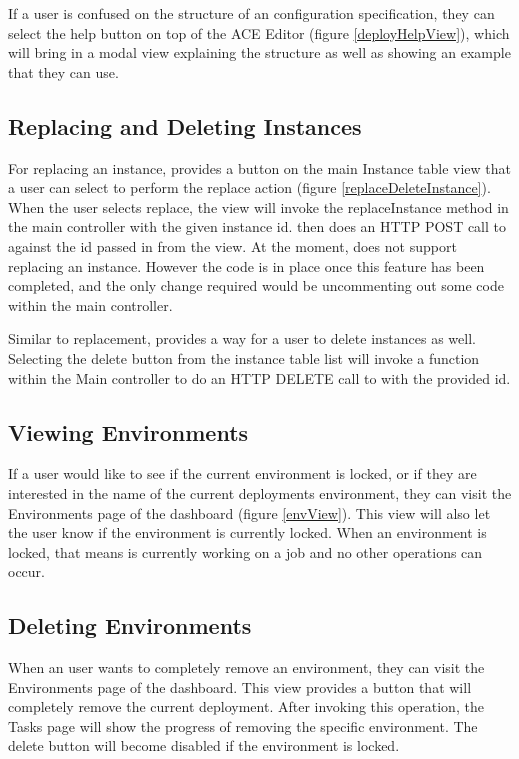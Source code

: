 If a user is confused on the structure of an configuration specification, they can select the help button on top of the ACE Editor (figure \ref{deployHelpView}), which will bring in a modal view explaining the structure as well as showing an example that they can use.

\subsection{Replacing and Deleting Instances}

For replacing an instance, \projectName{} provides a button on the main Instance table view that a user can select to perform the replace action (figure \ref{replaceDeleteInstance}). When the user selects replace, the view will invoke the replaceInstance method in the main controller with the given instance id. \projectName{} then does an HTTP POST call to \ancor{} against the id passed in from the view. At the moment, \ancor{} does not support replacing an instance. However the code is in place once this feature has been completed, and the only change required would be uncommenting out some code within the main controller.

Similar to replacement, \projectName{} provides a way for a user to delete instances as well. Selecting the delete button from the instance table list will invoke a function within the Main controller to do an HTTP DELETE call to \ancor{} with the provided id.

\subsection{Viewing Environments}

If a user would like to see if the current environment is locked, or if they are interested in the name of the current deployments environment, they can visit the Environments page of the dashboard (figure \ref{envView}). This view will also let the user know if the environment is currently locked. When an environment is locked, that means \ancor{} is currently working on a job and no other operations can occur.

\subsection{Deleting Environments}

When an \ancor{} user wants to completely remove an environment, they can visit the Environments page of the dashboard. This view provides a button that will completely remove the current deployment. After invoking this operation, the Tasks page will show the progress of removing the specific environment. The delete button will become disabled if the environment is locked.


